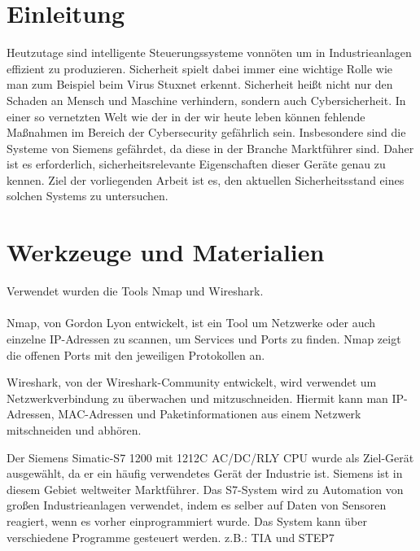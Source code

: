 \section{Einleitung}

Heutzutage sind intelligente Steuerungssysteme vonnöten um in Industrieanlagen effizient zu produzieren.
Sicherheit spielt dabei immer eine wichtige Rolle wie man zum Beispiel beim Virus Stuxnet erkennt.
Sicherheit heißt nicht nur den Schaden an Mensch und Maschine verhindern, sondern auch Cybersicherheit.
In einer so vernetzten Welt wie der in der wir heute leben können fehlende Maßnahmen im Bereich der Cybersecurity gefährlich sein.
Insbesondere sind die Systeme von Siemens gefährdet, da diese in der Branche Marktführer sind.
Daher ist es erforderlich, sicherheitsrelevante Eigenschaften dieser Geräte genau zu kennen. Ziel der vorliegenden Arbeit ist es, den aktuellen Sicherheitsstand eines solchen Systems zu untersuchen.

\section{Werkzeuge und Materialien}

Verwendet wurden die Tools Nmap und Wireshark.\\
\\
 Nmap, von Gordon Lyon entwickelt, ist ein Tool um Netzwerke oder auch einzelne IP-Adressen zu scannen, um Services und Ports zu finden. 
Nmap zeigt die offenen Ports mit den jeweiligen Protokollen an.
	  
 Wireshark, von der Wireshark-Community entwickelt, wird verwendet um Netzwerkverbindung zu überwachen und mitzuschneiden.
 Hiermit kann man IP-Adressen, MAC-Adressen und Paketinformationen aus einem Netzwerk mitschneiden und abhören.

 Der Siemens Simatic-S7 1200 mit 1212C AC/DC/RLY CPU wurde als Ziel-Gerät ausgewählt, da er ein häufig verwendetes Gerät der Industrie ist. 
Siemens ist in diesem Gebiet weltweiter Marktführer.
Das S7-System wird zu Automation von großen Industrieanlagen verwendet, indem es selber auf Daten von Sensoren reagiert, wenn es vorher einprogrammiert wurde.
Das System kann über verschiedene Programme gesteuert werden. z.B.: TIA und STEP7



